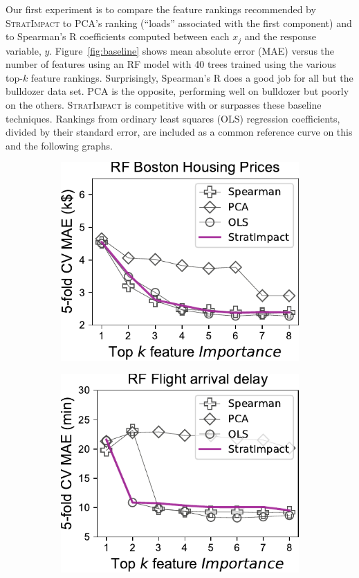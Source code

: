 \documentclass[11pt]{article}
\newcommand{\figref}[1]{Figure~\ref{#1}}
\newcommand{\simp}{\fontfamily{cmr}\textsc{\small StratImpact}}
\begin{document}
Our first experiment is to compare the feature rankings recommended by \simp{} to PCA's ranking (``loads'' associated with the first component) and to Spearman's R coefficients computed between each $x_j$ and the response variable, $y$. \figref{fig:baseline} shows mean absolute error  (MAE) versus the number of features using an RF model with 40 trees trained using the various top-$k$ feature rankings. Surprisingly, Spearman's R does a good job for all but the bulldozer data set. PCA is the opposite, performing well on bulldozer but poorly on the others. \simp{} is competitive with or surpasses these baseline techniques.  Rankings from ordinary least squares (OLS) regression coefficients, divided by their standard error, are included as a common reference curve on this and the following graphs. 

\begin{figure}
\centering
\begin{subfigure}{.245\textwidth}
    \centering
\includegraphics[scale=0.45]{images/boston-topk-baseline-Importance.pdf}
\subcaption{}
\end{subfigure}%
\begin{subfigure}{.245\textwidth}
    \centering
\includegraphics[scale=0.45]{images/flights-topk-baseline-Importance.pdf}

\end{subfigure}
\end{figure}
\end{document}
